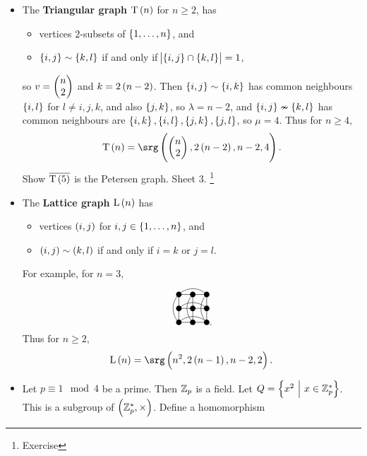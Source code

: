 \begin{example*}
\begin{itemize}
\item The \textbf{Triangular graph} $ \T\br{n} $ for $ n \ge 2 $, has
\begin{itemize}
\item vertices $ 2 $-subsets of $ \cbr{1, \dots, n} $, and
\item $ \cbr{i, j} \sim \cbr{k, l} $ if and only if $ \abs{\cbr{i, j} \cap \cbr{k, l}} = 1 $,
\end{itemize}
so $ v =\begin{pmatrix} n \\ 2 \end{pmatrix} $ and $ k = 2\br{n - 2} $. Then $ \cbr{i, j} \sim \cbr{i, k} $ has common neighbours $ \cbr{i, l} $ for $ l \ne i, j, k $, and also $ \cbr{j, k} $, so $ \lambda = n - 2 $, and $ \cbr{i, j} \nsim \cbr{k, l} $ has common neighbours are $ \cbr{i, k}, \cbr{i, l}, \cbr{j, k}, \cbr{j, l} $, so $ \mu = 4 $. Thus for $ n \ge 4 $,
$$ \T\br{n} = \srg\br{\twobyone{n}{2}, 2\br{n - 2}, n - 2, 4}. $$
Show $ \overline{\T\br{5}} $ is the Petersen graph. Sheet $ 3 $. \footnote{Exercise}
\item The \textbf{Lattice graph} $ \L\br{n} $ has
\begin{itemize}
\item vertices $ \br{i, j} $ for $ i, j \in \cbr{1, \dots, n} $, and
\item $ \br{i, j} \sim \br{k, l} $ if and only if $ i = k $ or $ j = l $.
\end{itemize}
For example, for $ n = 3 $,
$$
\begin{tikzpicture}
\fill (0, 0) circle (0.1);
\fill (0.5, 0) circle (0.1);
\fill (1, 0) circle (0.1);
\fill (0, -0.5) circle (0.1);
\fill (0.5, -0.5) circle (0.1);
\fill (1, -0.5) circle (0.1);
\fill (0, -1) circle (0.1);
\fill (0.5, -1) circle (0.1);
\fill (1, -1) circle (0.1);
\draw (0, 0) to (0.5, 0);
\draw (0.5, 0) to (1, 0);
\draw (0, 0) to [bend left=45] (1, 0);
\draw (0, 0) to (0, -0.5);
\draw (0.5, 0) to (0.5, -0.5);
\draw (1, 0) to (1, -0.5);
\draw (0, -0.5) to (0.5, -0.5);
\draw (0.5, -0.5) to (1, -0.5);
\draw (0, -0.5) to [bend left=45] (1, -0.5);
\draw (0, -0.5) to (0, -1);
\draw (0.5, -0.5) to (0.5, -1);
\draw (1, -0.5) to (1, -1);
\draw (0, -1) to (0.5, -1);
\draw (0.5, -1) to (1, -1);
\draw (0, -1) to [bend left=45] (1, -1);
\draw (0, 0) to [bend right=45] (0, -1);
\draw (0.5, 0) to [bend right=45] (0.5, -1);
\draw (1, 0) to [bend right=45] (1, -1);
\end{tikzpicture}.
$$
Thus for $ n \ge 2 $,
$$ \L\br{n} = \srg\br{n^2, 2\br{n - 1}, n - 2, 2}. $$
\item Let $ p \equiv 1 \mod 4 $ be a prime. Then $ \mathbb{Z}_p $ is a field. Let $ Q = \cbr{x^2 \st x \in \ZZ_p^*} $. This is a subgroup of $ \br{\ZZ_p^*, \times} $. Define a homomorphism

\end{itemize}
\end{example*}
